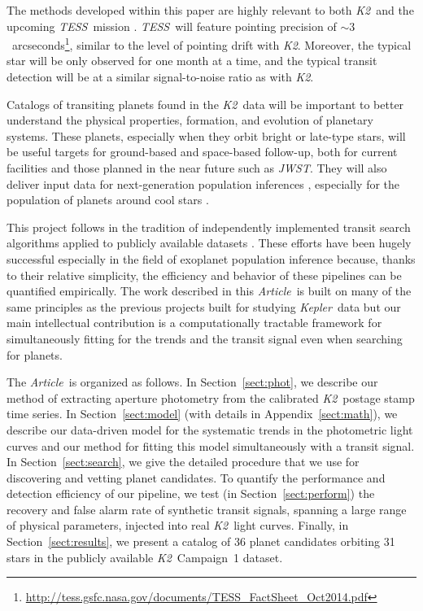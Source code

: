 \documentclass[12pt,preprint]{aastex}
\newcommand{\project}[1]{\textsl{#1}} %
\newcommand{\kepler}{\project{Kepler}}
\newcommand{\KT}{\project{K2}}
\newcommand{\tess}{\project{TESS}}
\newcommand{\jwst}{\project{JWST}}
\newcommand{\paper}{\textsl{Article}}
\newcommand{\sectionname}{Section}
\newcommand{\Sect}[1]{\sectionname~\ref{sect:#1}}
\newcommand{\sect}[1]{\Sect{#1}}
\newcommand{\App}[1]{Appendix~\ref{sect:#1}}
\newcommand{\app}[1]{\App{#1}}
\begin{document}
The methods developed within this paper are highly relevant to both \KT\ and
the upcoming \tess\ mission \citep{Ricker:2014}.
\tess\ will feature pointing precision of $\sim
3$~arcseconds\footnote{\url{http://tess.gsfc.nasa.gov/documents/TESS_FactSheet_Oct2014.pdf}},
similar to the level of pointing drift with \KT.
Moreover, the typical star will be only observed for one month at a time, and
the typical transit detection will be at a similar signal-to-noise ratio as
with \KT.

Catalogs of transiting planets found in the \KT\ data will be important to
better understand the physical properties, formation, and evolution of
planetary systems.
These planets, especially when they orbit bright or late-type stars, will be
useful targets for ground-based and space-based follow-up, both for current
facilities and those planned in the near future such as \jwst.
They will also deliver input data for next-generation population inferences
\citep{dfm}, especially for the population of planets around cool stars
\citep[for example,][]{dressing}.

This project follows in the tradition of independently implemented transit
search algorithms applied to publicly available datasets \citep[such
as][]{petigura1, petigura2, roberto, dressing}.
These efforts have been hugely successful especially in the field of exoplanet
population inference because, thanks to their relative simplicity, the
efficiency and behavior of these pipelines can be quantified empirically.
The work described in this \paper\ is built on many of the same principles as
the previous projects built for studying \kepler\ data but our main
intellectual contribution is a computationally tractable framework for
simultaneously fitting for the trends and the transit signal even when
searching for planets.

The \paper\ is organized as follows.
In \sect{phot}, we describe our method of extracting aperture photometry from
the calibrated \KT\ postage stamp time series.
In \sect{model} (with details in \app{math}), we describe our data-driven
model for the systematic trends in the photometric light curves and our method
for fitting this model simultaneously with a transit signal.
In \sect{search}, we give the detailed procedure that we use for discovering
and vetting planet candidates.
To quantify the performance and detection efficiency of our pipeline, we test
(in \sect{perform}) the recovery and false alarm rate of synthetic transit
signals, spanning a large range of physical parameters, injected into real
\KT\ light curves.
Finally, in \sect{results}, we present a catalog of 36 planet candidates
orbiting 31 stars in the publicly available \KT\ Campaign~1 dataset.
\end{document}
